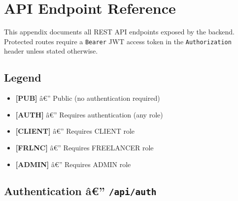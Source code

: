 ﻿%
\chapter{API Endpoint Reference}
\label{app:api}

This appendix documents all REST API endpoints exposed by the \projectname{} backend. Protected routes require a \texttt{Bearer} JWT access token in the \texttt{Authorization} header unless stated otherwise.

\section*{Legend}

\begin{itemize}
  \item \textbf{[PUB]} â€” Public (no authentication required)
  \item \textbf{[AUTH]} â€” Requires authentication (any role)
  \item \textbf{[CLIENT]} â€” Requires CLIENT role
  \item \textbf{[FRLNC]} â€” Requires FREELANCER role
  \item \textbf{[ADMIN]} â€” Requires ADMIN role
\end{itemize}

\section*{Authentication â€” \texttt{/api/auth}}

